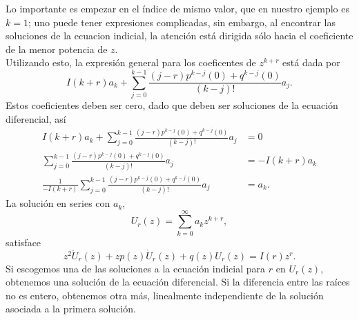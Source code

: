 \documentclass[main.tex]{subfiles}
\begin{document}
\indent Lo importante es empezar en el índice de mismo valor, que en nuestro ejemplo es $k=1$; uno puede tener expresiones complicadas, sin embargo, al encontrar las soluciones de la ecuacion indicial, la atención está dirigida sólo hacia el coeficiente de la menor potencia de $z$.\\
\indent Utilizando esto, la expresión general para los coeficentes de $z^{k+r}$ está dada por
\[
  I(k+r)a_{k}+\sum_{j=0}^{k-1}\frac{(j-r)p^{k-j}(0)+q^{k-j}(0)}{(k-j)!}a_{j}.
\]
\indent Estos coeficientes deben ser cero, dado que deben ser soluciones de la ecuación diferencial, así
\begin{align*}
  I(k+r)a_{k}+\sum_{j=0}^{k-1}\frac{(j-r)p^{k-j}(0)+q^{k-j}(0)}{(k-j)!}a_{j}&=0\\
  \sum_{j=0}^{k-1}\frac{(j-r)p^{k-j}(0)+q^{k-j}(0)}{(k-j)!}a_{j}&=-I(k+r)a_{k}\\
  \frac{1}{-I(k+r)}\sum_{j=0}^{k-1}\frac{(j-r)p^{k-j}(0)+q^{k-j}(0)}{(k-j)!}a_{j}&=a_{k}.
\end{align*}
\indent La solución en series con $a_{k}$,
\[
  U_{r}(z)=\sum_{k=0}^{\infty}a_{k}z^{k+r},
\]
satisface
\[
  z^{2}\ddot{U}_{r}(z)+zp(z)\dot{U}_{r}(z)+q(z)U_{r}(z)=I(r)z^{r}.
\]
\indent Si escogemos una de las soluciones a la ecuación indicial para $r$ en $U_{r}(z)$, obtenemos una solución de la ecuación diferencial. Si la diferencia entre las raíces no es entero, obtenemos otra más, linealmente independiente de la solución asociada a la primera solución.\\
\end{document}
